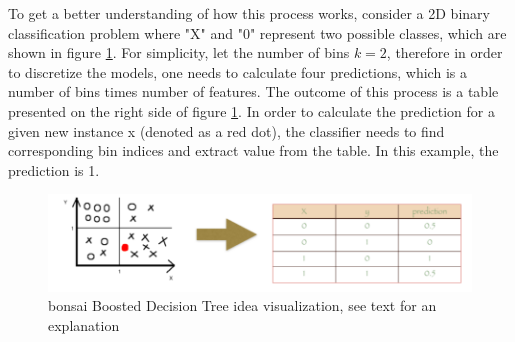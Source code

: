 To get a better understanding of how this process works, consider a 2D binary classification problem where "X" and "0" represent two possible classes, which are shown in figure \ref{fig:bbdt_theory}. For simplicity, let the number of bins $k=2$, therefore in order to discretize the models, one needs to calculate four predictions, which is a number of bins times number of features. The outcome of this process is a table presented on the right side of figure \ref{fig:bbdt_theory}. In order to calculate the prediction for a given new instance x (denoted as a red dot), the classifier needs to find corresponding bin indices and extract value from the table. In this example, the prediction is 1. 



\begin{figure}[!h]
\centering
\includegraphics{figures/BBDT_explanation.png}
\caption{bonsai Boosted Decision Tree idea visualization, see text for an explanation
\label{fig:bbdt_theory}}
\end{figure} 